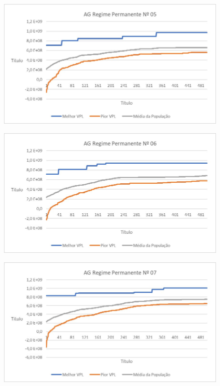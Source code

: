 \documentclass[12pt,a4paper]{report}
\begin{document}
\begin{figure}[H]
\centering

\includegraphics[scale=1]{ApC/AGRP/5}

\end{figure}
\begin{figure}[H]
\centering

\includegraphics[scale=1]{ApC/AGRP/6}

\end{figure}
\begin{figure}[H]
\centering

\includegraphics[scale=1]{ApC/AGRP/7}

\end{figure}
\end{document}

